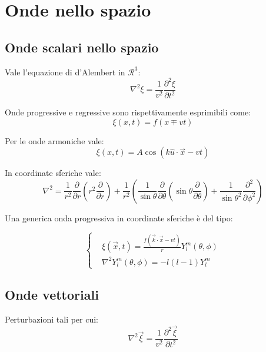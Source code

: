 \documentclass{article}
\begin{document}
\section{Onde nello spazio}
\subsection{Onde scalari nello spazio}
Vale l'equazione di d'Alembert in $\mathcal{R}^3$:
\begin{equation}
    \nabla^2 \xi=\frac{1}{v^2}\frac{\partial^2 \xi}{\partial t^2}
\end{equation}

Onde progressive e regressive sono rispettivamente esprimibili come:
\begin{equation}
    \xi(x,t)=f(x \mp vt)
\end{equation}

Per le onde armoniche vale:
\begin{equation}
    \xi(x,t)=A\cos(k\hat{u}\cdot\Vec{x}-vt)
\end{equation}

In coordinate sferiche vale:
\begin{equation}
    \nabla^2= \frac{1}{r^2}\frac{\partial}{\partial r}(r^2\frac{\partial}{\partial r})+\frac{1}{r^2}\left(\frac{1}{\sin{\theta}}\frac{\partial}{\partial \theta}(\sin{\theta}\frac{\partial}{\partial \theta})+\frac{1}{\sin{\theta}^2}\frac{\partial^2}{\partial\phi^2}\right)
\end{equation}

Una generica onda progressiva in coordinate sferiche è del tipo:

\begin{equation}
\left\{
\begin{aligned}
     & \xi(\Vec{x}, t)= \frac{f(\Vec{k}\cdot \Vec{x}-vt)}{r}Y^m_l(\theta, \phi) \\
     & \nabla^2Y^m_l(\theta,\phi)=-l(l-1)Y^m_l
\end{aligned}
\right.
\end{equation}

\subsection{Onde vettoriali}
Perturbazioni tali per cui:
\begin{equation}
    \nabla^2 \Vec{\xi}=\frac{1}{v^2}\frac{\partial^2 \Vec{\xi}}{\partial t^2}
\end{equation}
\end{document}
